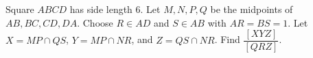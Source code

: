 Square $ABCD$ has side length $6$. Let $M,N,P,Q$ be the midpoints of $AB,BC,CD,DA$. Choose $R\in AD$ and $S\in AB$ with $AR=BS=1$. Let $X=MP\cap QS$, $Y=MP\cap NR$, and $Z=QS\cap NR$. Find $\dfrac{[XYZ]}{[QRZ]}$.

